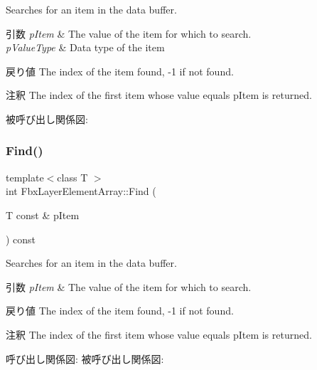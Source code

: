Searches for an item in the data buffer. 
\begin{DoxyParams}{引数}
{\em p\+Item} & The value of the item for which to search. \\
\hline
{\em p\+Value\+Type} & Data type of the item \\
\hline
\end{DoxyParams}
\begin{DoxyReturn}{戻り値}
The index of the item found, -\/1 if not found. 
\end{DoxyReturn}
\begin{DoxyRemark}{注釈}
The index of the first item whose value equals p\+Item is returned. 
\end{DoxyRemark}
被呼び出し関係図\+:
\mbox{\label{class_fbx_layer_element_array_a8dcc42ae3b8a351a1d5204a416fe72de}} 
\subsubsection{\texorpdfstring{Find()}{Find()}\hspace{0.1cm}{\footnotesize\ttfamily [2/2]}}
{\footnotesize\ttfamily template$<$class T $>$ \\
int Fbx\+Layer\+Element\+Array\+::\+Find (\begin{DoxyParamCaption}\item[{T const \&}]{p\+Item }\end{DoxyParamCaption}) const}

Searches for an item in the data buffer. 
\begin{DoxyParams}{引数}
{\em p\+Item} & The value of the item for which to search. \\
\hline
\end{DoxyParams}
\begin{DoxyReturn}{戻り値}
The index of the item found, -\/1 if not found. 
\end{DoxyReturn}
\begin{DoxyRemark}{注釈}
The index of the first item whose value equals p\+Item is returned. 
\end{DoxyRemark}
呼び出し関係図\+:
被呼び出し関係図\+:
\mbox{\label{class_fbx_layer_element_array_aa4d2a9a111e4bc4d98c84a18efd65cbd}} 
